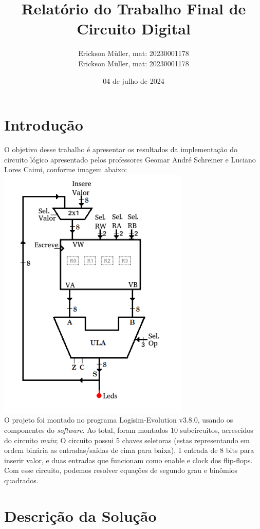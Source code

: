 \documentclass[]{article}
\title{Relatório do Trabalho Final de Circuito Digital}
\author{Erickson Müller, mat: 20230001178\\ Erickson Müller, mat: 20230001178}
\date{04 de julho de 2024}
\begin{document}
\maketitle
\pagebreak
\section{Introdução}
	O objetivo desse trabalho é apresentar os resultados da implementação do circuito lógico apresentado pelos professores Geomar André Schreiner e Luciano Lores Caimi, conforme imagem abaixo:
	\\
	\includegraphics[scale=0.8]{Images/Circuito Lógico.png}
	\\
	O projeto foi montado no programa Logisim-Evolution v3.8.0, usando os componentes do \textit{software}. Ao total, foram montados 10 subcircuitos, acrescidos do circuito \textit{main}; O circuito possui 5 chaves seletoras (estas representando em ordem binária as entradas/saídas de cima para baixa), 1 entrada de 8 bits para inserir valor, e duas entradas que funcionam como enable e clock dos flip-flops. Com esse circuito, podemos resolver equações de segundo grau e binômios quadrados.
	
	
	
	\newpage
\section{Descrição da Solução}
	
\end{document}
